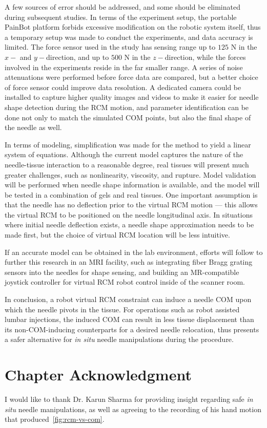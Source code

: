 A few sources of error should be addressed, and some should be eliminated during subsequent studies. In terms of the experiment setup, the portable PainBot platform forbids excessive modification on the robotic system itself, thus a temporary setup was made to conduct the experiments, and data accuracy is limited. The force sensor used in the study has sensing range up to $125$ N in the $x-$ and $y-$direction, and up to $500$ N in the $z-$direction, while the forces involved in the experiments reside in the far smaller range. A series of noise attenuations were performed before force data are compared, but a better choice of force sensor could improve data resolution. A dedicated camera could be installed to capture higher quality images and videos to make it easier for needle shape detection during the RCM motion, and parameter identification can be done not only to match the simulated COM points, but also the final shape of the needle as well.

In terms of modeling, simplification was made for the method to yield a linear system of equations. Although the current model captures the nature of the needle-tissue interaction to a reasonable degree, real tissues will present much greater challenges, such as nonlinearity, viscosity, and rupture. Model validation will be performed when needle shape information is available, and the model will be tested in a combination of gels and real tissues. One important assumption is that the needle has no deflection prior to the virtual RCM motion --- this allows the virtual RCM to be positioned on the needle longitudinal axis. In situations where initial needle deflection exists, a needle shape approximation needs to be made first, but the choice of virtual RCM location will be less intuitive.

If an accurate model can be obtained in the lab environment, efforts will follow to further this research in an MRI facility, such as integrating fiber Bragg grating sensors into the needles for shape sensing, and building an MR-compatible joystick controller for virtual RCM robot control inside of the scanner room.

In conclusion, a robot virtual RCM constraint can induce a needle COM upon which the needle pivots in the tissue. For operations such as robot assisted lumbar injections, the induced COM can result in less tissue displacement than its non-COM-inducing counterparts for a desired needle relocation, thus presents a safer alternative for \textit{in situ} needle manipulations during the procedure.

\section{Chapter Acknowledgment}
\label{sec:chap-2-ack}

I would like to thank Dr. Karun Sharma for providing insight regarding safe \textit{in situ} needle manipulations, as well as agreeing to the recording of his hand motion that produced~\cref{fig:rcm-vs-com}.

